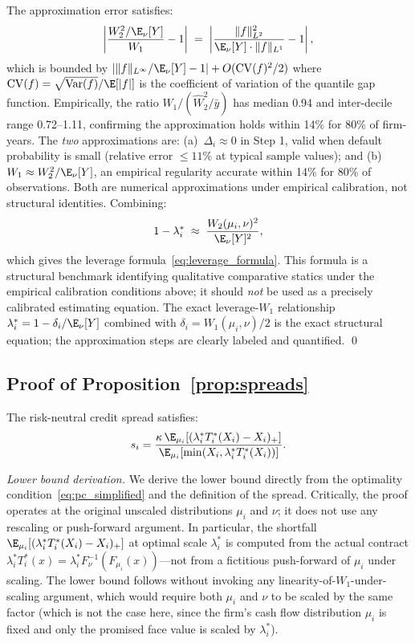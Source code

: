 The approximation error satisfies:
\[
  \left|\frac{W_2^2/\E_\nu[Y]}{W_1} - 1\right| \;=\; \left|\frac{\|f\|_{L^2}^2}{\E_\nu[Y] \cdot \|f\|_{L^1}} - 1\right|,
\]
which is bounded by $|\|f\|_{L^\infty}/\E_\nu[Y] - 1| + O(\mathrm{CV}(f)^2/2)$ where $\mathrm{CV}(f) = \sqrt{\mathrm{Var}(f)}/\E[|f|]$ is the coefficient of variation of the quantile gap function. Empirically, the ratio $\widehat{W}_1/(\widehat{W}_2^2/\bar{y})$ has median 0.94 and inter-decile range 0.72--1.11, confirming the approximation holds within 14\% for 80\% of firm-years. The \emph{two} approximations are: (a)~$\Delta_i \approx 0$ in Step 1, valid when default probability is small (relative error $\leq 11\%$ at typical sample values); and (b)~$W_1 \approx W_2^2/\E_\nu[Y]$, an empirical regularity accurate within 14\% for 80\% of observations. Both are numerical approximations under empirical calibration, not structural identities. Combining:
\begin{equation}
  1 - \lambda_i^* \;\approx\; \frac{W_2(\mu_i,\nu)^2}{\E_\nu[Y]^2},
  \label{eq:lambda_approx_combined}
\end{equation}
which gives the leverage formula~\eqref{eq:leverage_formula}. This formula is a structural benchmark identifying qualitative comparative statics under the empirical calibration conditions above; it should \emph{not} be used as a precisely calibrated estimating equation. The exact leverage-$W_1$ relationship $\lambda_i^* = 1 - \delta_i/\E_\nu[Y]$ combined with $\delta_i = W_1(\mu_i,\nu)/2$ is the exact structural equation; the approximation steps are clearly labeled and quantified. \qed

\subsection*{Proof of Proposition~\ref{prop:spreads}}

The risk-neutral credit spread satisfies:
\[
  s_i = \frac{\kappa\,\E_{\mu_i}[(\lambda_i^* T_i^*(X_i)-X_i)_+]}{\E_{\mu_i}[\min(X_i, \lambda_i^* T_i^*(X_i))]}.
\]

\emph{Lower bound derivation.} We derive the lower bound directly from the optimality condition~\eqref{eq:pc_simplified} and the definition of the spread. Critically, the proof operates at the original unscaled distributions $\mu_i$ and $\nu$; it does not use any rescaling or push-forward argument. In particular, the shortfall $\E_{\mu_i}[(\lambda_i^* T_i^*(X_i)-X_i)_+]$ at optimal scale $\lambda_i^*$ is computed from the actual contract $\lambda_i^* T_i^*(x) = \lambda_i^* F_\nu^{-1}(F_{\mu_i}(x))$---not from a fictitious push-forward of $\mu_i$ under scaling. The lower bound follows without invoking any linearity-of-$W_1$-under-scaling argument, which would require both $\mu_i$ and $\nu$ to be scaled by the same factor (which is not the case here, since the firm's cash flow distribution $\mu_i$ is fixed and only the promised face value is scaled by $\lambda_i^*$).

